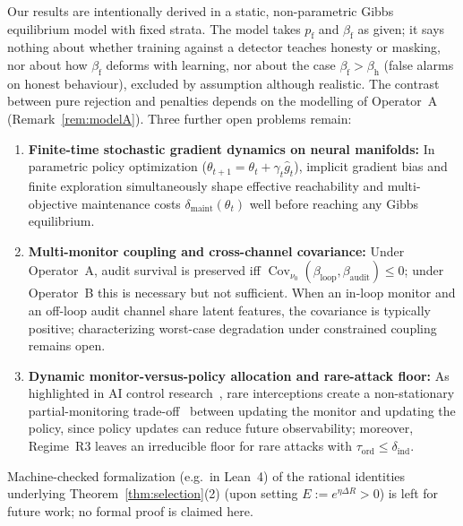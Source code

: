 \documentclass[11pt,a4paper]{article}
\newcommand{\Cov}{\operatorname{Cov}}
\begin{document}
Our results are intentionally derived in a static, non-parametric Gibbs equilibrium model with fixed strata. The model takes $p_{\mathrm{f}}$ and $\beta_{\mathrm{f}}$ as given; it says nothing about whether training against a detector teaches honesty or masking, nor about how $\beta_{\mathrm{f}}$ deforms with learning, nor about the case $\beta_{\mathrm{f}} > \beta_{\mathrm{h}}$ (false alarms on honest behaviour), excluded by assumption although realistic. The contrast between pure rejection and penalties depends on the modelling of Operator~A (Remark~\ref{rem:modelA}). Three further open problems remain:
\begin{enumerate}
  \item \textbf{Finite-time stochastic gradient dynamics on neural manifolds:} In parametric policy optimization ($\theta_{t+1} = \theta_t + \gamma_t \hat{g}_t$), implicit gradient bias and finite exploration simultaneously shape effective reachability and multi-objective maintenance costs $\delta_{\mathrm{maint}}(\theta_t)$ well before reaching any Gibbs equilibrium.
  \item \textbf{Multi-monitor coupling and cross-channel covariance:} Under Operator~A, audit survival is preserved iff $\Cov_{\nu_0}(\beta_{\mathrm{loop}}, \beta_{\mathrm{audit}}) \le 0$; under Operator~B this is necessary but not sufficient. When an in-loop monitor and an off-loop audit channel share latent features, the covariance is typically positive; characterizing worst-case degradation under constrained coupling remains open.
  \item \textbf{Dynamic monitor-versus-policy allocation and rare-attack floor:} As highlighted in AI control research~\cite{ukaisi2025}, rare interceptions create a non-stationary partial-monitoring trade-off~\cite{bartok2014} between updating the monitor and updating the policy, since policy updates can reduce future observability; moreover, Regime~R3 leaves an irreducible floor for rare attacks with $\tau_{\mathrm{ord}} \le \delta_{\mathrm{ind}}$.
\end{enumerate}
Machine-checked formalization (e.g.\ in Lean~4) of the rational identities underlying Theorem~\ref{thm:selection}(2) (upon setting $E := e^{\eta \Delta R} > 0$) is left for future work; no formal proof is claimed here.
\end{document}
